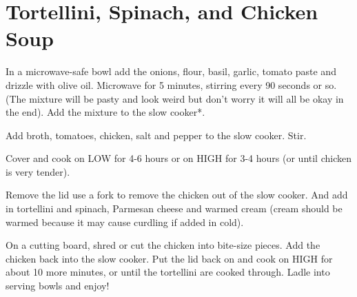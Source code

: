 \section{Tortellini, Spinach, and Chicken Soup}
\begin{recipe}
	




In a microwave-safe bowl add the onions, flour, basil, garlic, tomato paste and drizzle with olive oil. Microwave for 5 minutes, stirring every 90 seconds or so. (The mixture will be pasty and look weird but don’t worry it will all be okay in the end). Add the mixture to the slow cooker*.

Add broth, tomatoes, chicken, salt and pepper to the slow cooker. Stir.

Cover and cook on LOW for 4-6 hours or on HIGH for 3-4 hours (or until chicken is very tender).

Remove the lid use a fork to remove the chicken out of the slow cooker.  And add in tortellini and spinach, Parmesan cheese and warmed cream (cream should be warmed because it may cause curdling if added in cold).

On a cutting board, shred or cut the chicken into bite-size pieces. Add the chicken back into the slow cooker. Put the lid back on and cook on HIGH for about 10 more minutes, or until the tortellini are cooked through. Ladle into serving bowls and enjoy!

	
\end{recipe}
